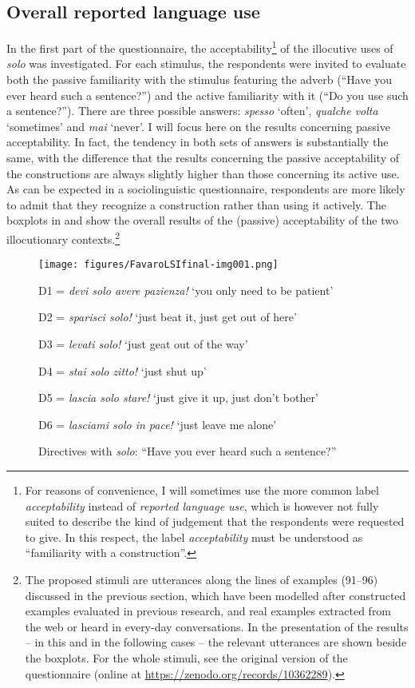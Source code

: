 \subsection{Overall reported language use}
\hypertarget{Toc124860673}{}
In the first part of the questionnaire, the acceptability\footnote{For reasons of convenience, I will sometimes use the more common label \textit{acceptability} instead of \textit{reported language use}, which is however not fully suited to describe the kind of judgement that the respondents were requested to give. In this respect, the label \textit{acceptability} must be understood as “familiarity with a construction”.} of the illocutive uses of \textit{solo} was investigated. For each stimulus, the respondents were invited to evaluate both the passive familiarity with the stimulus featuring the adverb (“Have you ever heard such a sentence?”) and the active familiarity with it (“Do you use such a sentence?”). There are three possible answers: \textit{spesso} ‘often’, \textit{qualche volta} ‘sometimes’ and \textit{mai} ‘never’. I will focus here on the results concerning passive acceptability. In fact, the tendency in both sets of answers is substantially the same, with the difference that the results concerning the passive acceptability of the constructions are always slightly higher than those concerning its active use. As can be expected in a sociolinguistic questionnaire, respondents are more likely to admit that they recognize a construction rather than using it actively. The boxplots in  and  show the overall results of the (passive) acceptability of the two illocutionary contexts.\footnote{The proposed stimuli are utterances along the lines of examples (91–96) discussed in the previous section, which have been modelled after constructed examples evaluated in previous research, and real examples extracted from the web or heard in every-day conversations. In the presentation of the results – in this and in the following cases – the relevant utterances are shown beside the boxplots. For the whole stimuli, see the original version of the questionnaire (online at \url{https://zenodo.org/records/10362289}).}

\begin{figure}
\texttt{[image: figures/FavaroLSIfinal-img001.png]}


{\small\raggedright
D1 = \textit{devi solo avere pazienza!} ‘you only need to be patient’

D2 = \textit{sparisci solo!} ‘just beat it, just get out of here’

D3 = \textit{levati solo!} ‘just geat out of the way’

D4 = \textit{stai solo zitto!} ‘just shut up’

D5 = \textit{lascia solo stare!} ‘just give it up, just don’t bother’

D6 = \textit{lasciami solo in pace!} ‘just leave me alone’\par
}
\caption{\label{fig:key:8.1} Directives with \textit{solo}: “Have you ever heard such a sentence?”}
\end{figure}

